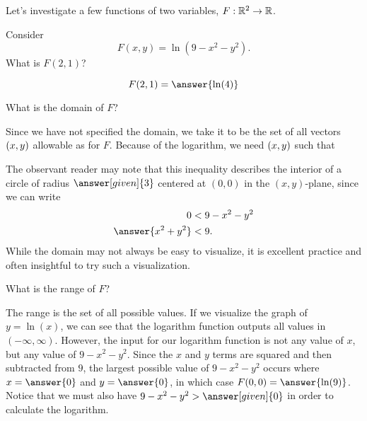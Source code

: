 \documentclass{ximera}
\begin{document}
Let's investigate a few functions of two variables, $F:\mathbb R^2\to\mathbb R$.

\begin{question}
  Consider
  \[
  F(x,y) = \ln(9-x^2-y^2).
  \]
  What is $F(2,1)$?
  \begin{prompt}
    \[
    F(2,1) = \answer{\ln(4)}
    \]
  \end{prompt}
  \begin{question}
    What is the domain of $F$?
    
    \begin{prompt}
      Since we have not specified the domain, we take it to be the set of all vectors $\left(x,y\right)$ allowable as
       for $F$.
      Because of the logarithm, we need $\left(x,y\right)$ such that 
      
      The observant reader may note that this inequality
      describes the interior of a circle of radius $\answer[given]{3}$
      centered at $(0,0)$ in the $(x,y)$-plane, since we can write
      \begin{align*}
        0 & < 9-x^2-y^2 \\
        \answer{x^2+y^2} &< 9.
      \end{align*}
      While the domain may not always be easy to visualize, it is excellent practice and often insightful to try such a visualization.
      
    \end{prompt}
    \begin{question}
      What is the range of $F$?
      
      \begin{prompt}
        The range is the set of all possible
         values.  If we visualize 
        the graph of $y = \ln(x)$, we can see that the logarithm function outputs all 
        values in $(-\infty, \infty)$.  However, the input for our logarithm function is 
        not any value of $x$, but any value of $9 - x^2 - y^2$. Since 
        the $x$ and $y$ terms are squared and then subtracted from $9$, the 
        largest possible value of $9-x^2-y^2$ occurs where $x=\answer{0}$ and
        $y=\answer{0}$, in which case $F(0,0) = \answer{\ln(9)}$.  Notice that 
        we must also have $9-x^2-y^2 > \answer[given]{0}$ in order to calculate the 
        logarithm.
        

\end{prompt}
\end{question}
\end{question}
\end{question}
\end{document}
